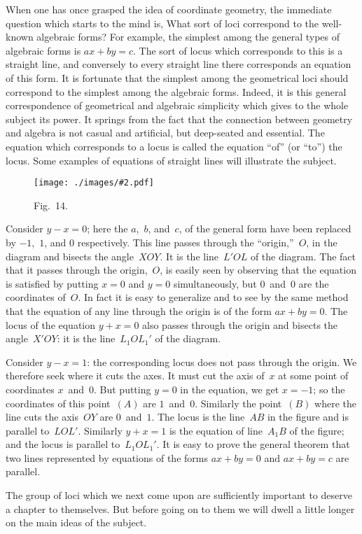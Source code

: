 \documentclass[12pt,leqno]{book}[2005/09/16]
\newcommand{\Typo}[2]{#2}
\newcommand{\Graphic}[2]{%
  \phantomsection\label{fig:#2}%
  \texttt{[image: ./images/\#2.pdf]}%
}
\newcommand{\DefWidth}{4in}%
\newcommand{\Figure}[2][\DefWidth]{%
  \begin{figure}[hbt!]
    \centering
    \phantomsection\label{fig:#2}
    \Graphic{#1}{fig#2}
    \caption{Fig.~#2.}
  \end{figure}\ignorespaces%
}
\newcommand{\PageSep}[1]{\ignorespaces}
\begin{document}
When one has once grasped the idea of coordinate
geometry, the immediate question
which starts to the mind is, What sort of
loci correspond to the well-known algebraic
forms? For example, the simplest among
the general types of algebraic forms is $ax + by = c$.
The sort of locus which corresponds
\PageSep{123}
to this is a straight line, and conversely to
every straight line there corresponds an equation
of this form. It is fortunate that the
simplest among the geometrical loci should
correspond to the simplest among the algebraic
forms. Indeed, it is this general correspondence
of geometrical and algebraic simplicity
which gives to the whole subject its
power. It springs from the fact that the
connection between geometry and algebra is
not casual and artificial, but deep-seated and
essential. The equation which corresponds
to a locus is called the equation ``of'' (or
``to'') the locus. Some examples of equations
of straight lines will illustrate the subject.
\Figure[3.75in]{14}
\PageSep{124}

Consider $y - x = 0$; here the $a$,~$b$, and~$c$, of
the general form have been replaced by $-1$,~$1$,
and $0$ respectively. This line passes through
the ``origin,''~$O$, in the diagram and bisects
the angle~$XOY$. It is the line~$L'OL$ of the
diagram. The fact that it passes through the
origin,~$O$, is easily seen by observing that the
equation is satisfied by putting $x = 0$ and
$y = 0$ simultaneously, but $0$~and~$0$ are the coordinates
of~$O$. In fact it is easy to generalize
and to see by the same method that the
equation of any line through the origin is of
the form $ax + by = 0$. The locus of\Typo{}{ the} equation
$y + x = 0$ also passes through the origin and
bisects the angle~$X'OY$: it is the line~$L_{1}OL_{1}'$
of the diagram.

Consider $y - x = 1$: the corresponding locus
does not pass through the origin. We therefore
seek where it cuts the axes. It must cut
the axis of~$x$ at some point of coordinates
$x$~and~$0$. But putting $y = 0$ in the equation,
we get $x = -1$; so the coordinates of this
point~$(A)$ are $1$~and~$0$. Similarly the point~$(B)$
where the line cuts the axis~$OY$ are $0$~and~$1$.
The locus is the line~$AB$ in the figure and
is parallel to~$LOL'$. Similarly $y + x = 1$ is the
equation of line~$A_{1}B$ of the figure; and the
locus is parallel to~$L_{1}OL_{1}'$. It is easy to prove
the general theorem that two lines represented
by equations of the forms $ax + by = 0$ and
$ax + by = c$ are parallel.
\PageSep{125}

The group of loci which we next come upon
are sufficiently important to deserve a chapter
to themselves. But before going on to
them we will dwell a little longer on the main
ideas of the subject.
\end{document}
